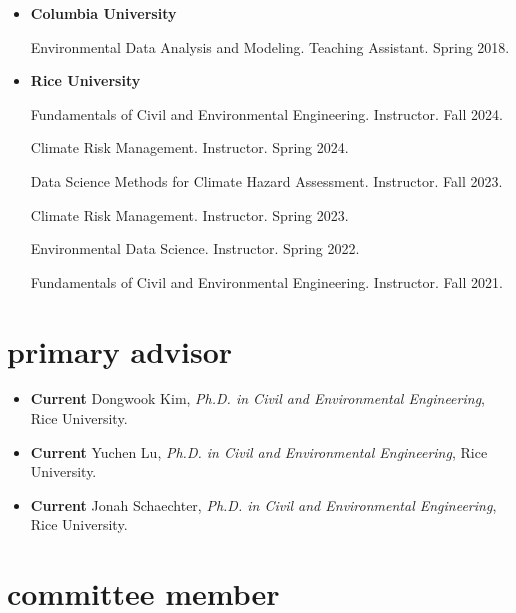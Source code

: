 \documentclass[10pt,oneside]{article}
\begin{document}
\begin{itemize}[label={}]

  \item \textbf{Columbia University}

        Environmental Data Analysis and Modeling. Teaching Assistant. Spring 2018.


  \item \textbf{Rice University}

        Fundamentals of Civil and Environmental Engineering. Instructor. Fall 2024.

        Climate Risk Management. Instructor. Spring 2024.

        Data Science Methods for Climate Hazard Assessment. Instructor. Fall 2023.

        Climate Risk Management. Instructor. Spring 2023.

        Environmental Data Science. Instructor. Spring 2022.

        Fundamentals of Civil and Environmental Engineering. Instructor. Fall 2021.


\end{itemize}


\section{primary advisor}

\mbox{}\vspace{-\dimexpr\baselineskip\relax}

\begin{itemize}[label={}]


  \item \textbf{Current} Dongwook Kim, \textit{Ph.D. in Civil and Environmental Engineering}, Rice University.

  \item \textbf{Current} Yuchen Lu, \textit{Ph.D. in Civil and Environmental Engineering}, Rice University.

  \item \textbf{Current} Jonah Schaechter, \textit{Ph.D. in Civil and Environmental Engineering}, Rice University.



\end{itemize}

\section{committee member}
\end{document}

